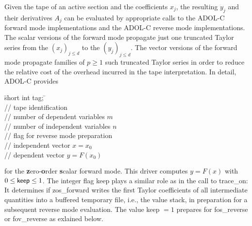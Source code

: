 \documentclass[11pt,twoside]{article}
\begin{document}
Given the tape of an active section and the coefficients $x_j$, 
the resulting $y_j$ and their derivatives $A_j$ can be evaluated
by appropriate calls to the ADOL-C forward mode implementations and
the ADOL-C reverse mode implementations. The scalar versions of the forward
mode propagate just one truncated Taylor series from the $(x_j)_{j\leq d}$
to the $(y_j)_{j\leq d}$. The vector versions of the forward
mode propagate families of $p\geq 1$ such truncated Taylor series
in order to reduce the relative cost of the overhead incurred
in the tape interpretation. In detail, ADOL-C provides 
\begin{tabbing}
\hspace{0.5in}\={\sf short int tag;} \hspace{1.1in}\= \kill    %
\\
         \> // tape identification \\
                 \> // number of  dependent variables $m$\\
                 \> // number of independent variables $n$\\
              \> // flag for reverse mode preparation\\
           \> // independent vector $x=x_0$\\
           \> // dependent vector $y=F(x_0)$
\end{tabbing}                 
for the {\bf z}ero-{\bf o}rder {\bf s}calar forward mode. This driver computes
$y=F(x)$ with $0\leq\text{\sf keep}\leq 1$. The integer
flag {\sf keep} plays a similar role as in the call to  
{\sf trace\_on}: It determines if {\sf zos\_forward} writes
the first Taylor coefficients of all intermediate quantities into a buffered
temporary file, i.e., the value stack, in preparation for a subsequent 
reverse mode evaluation. The value {\sf keep} $=1$
prepares for {\sf fos\_reverse} or {\sf fov\_reverse} as exlained below.
\end{document}
